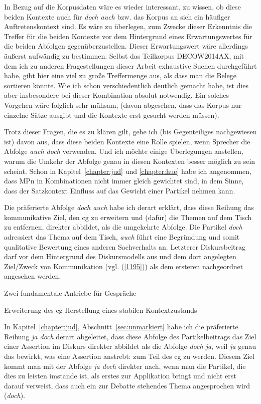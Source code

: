 {In Bezug auf die Korpusdaten wäre es wieder interessant, zu wissen, ob diese beiden Kontexte auch für \textit{doch auch} bzw. das Korpus an sich ein häufiger Auftre\-tenskontext sind. Es wäre zu überlegen, zum Zwecke dieser Erkenntnis die Treffer für die beiden Kontexte vor dem Hintergrund eines Erwartungswertes für die beiden Abfolgen gegenüberzustellen. Dieser Erwartungswert wäre allerdings äußerst aufwändig zu bestimmen. Selbst das Teilkorpus DECOW2014AX, mit dem ich zu anderen Fragestellungen dieser Arbeit exhaustive Suchen durchgeführt habe, gibt hier eine viel zu große Treffermenge aus, als dass man die Belege sortieren könnte. Wie ich schon verschiedentlich deutlich gemacht habe, ist dies aber insbesondere bei dieser Kombination absolut notwendig. Ein solches Vorgehen wäre folglich sehr mühsam, (davon abgesehen, dass das Korpus nur einzelne Sätze ausgibt und die Kontexte erst gesucht werden müssen). 

Trotz dieser Fragen, die es zu klären gilt, gehe ich (bis Gegenteiliges nachgewie\-sen ist) davon aus, dass diese beiden Kontexte eine Rolle spielen, wenn Sprecher die Abfolge \textit{auch doch} verwenden. Und ich möchte einige Überlegungen anstellen, warum die Umkehr der Abfolge genau in diesen Kontexten besser möglich zu sein scheint. Schon in Kapitel~\ref{chapter:jud} und \ref{chapter:hue} habe ich angenommen, dass MPn in Kombinationen nicht immer gleich gewichtet sind, in dem Sinne, dass der Satzkontext Einfluss auf das Gewicht einer Partikel nehmen kann. 

Die präferierte Abfolge \textit{doch auch} habe ich derart erklärt, dass diese Reihung das kommunikative Ziel, den cg zu erweitern und (dafür) die Themen auf dem Tisch zu entfernen, direkter abbildet, als die umgekehrte Abfolge. Die Partikel \textit{doch} adressiert das Thema auf dem Tisch, \textit{auch} führt eine Begründung und somit qualitative Bewertung eines anderen Sachverhalts an. Letzterer Diskursbeitrag darf vor dem Hintergrund des Diskursmodells aus \citet{Farkas2010} und dem dort angelegten Ziel/Zweck von Kommunikation (vgl. (\ref{1195})) als dem ersteren nachgeordnet angesehen werden.

\begin{exe}
	\ex\label{1195} Zwei fundamentale Antriebe für Gespräche 
		\begin{xlist}	
			\ex\label{1195a} Erweiterung des cg
			\ex\label{1195b} Herstellung eines stabilen Kontextzustands
			\newline
			\hbox{}\hfill\hbox {\citet[87]{Farkas2010}}
		\end{xlist}
\end{exe}
In Kapitel~\ref{chapter:jud}, Abschnitt~\ref{sec:unmarkiert} habe ich die präferierte Reihung \textit{ja doch} derart abgeleitet, dass diese Abfolge des Partikelbeitrags das Ziel einer Assertion im Diskurs direkter abbildet als die Abfolge \textit{doch ja}, weil \textit{ja} genau das bewirkt, was eine Assertion anstrebt: zum Teil des cg zu werden. Diesem Ziel kommt man mit der Abfolge \textit{ja doch} direkter nach, wenn man die Partikel, die dies zu leisten imstande ist, als erstes zur Applikation bringt und nicht erst darauf verweist, dass auch ein zur Debatte stehendes Thema angesprochen wird (\textit{doch}).  

}
